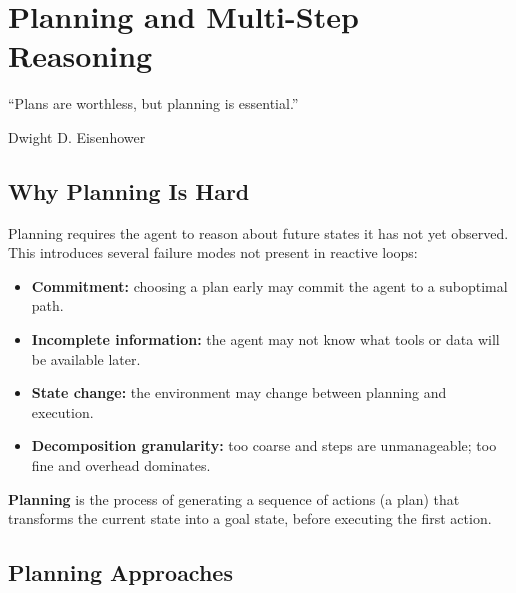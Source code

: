 \chapter{Planning and Multi-Step Reasoning}
\label{ch:planning}

\epigraph{``Plans are worthless, but planning is essential.''}{Dwight D. Eisenhower}


\section{Why Planning Is Hard}

Planning requires the agent to reason about future states it has not yet observed. This introduces several failure modes not present in reactive loops:

\begin{itemize}
	\item \textbf{Commitment:} choosing a plan early may commit the agent to a suboptimal path.
	\item \textbf{Incomplete information:} the agent may not know what tools or data will be available later.
	\item \textbf{State change:} the environment may change between planning and execution.
	\item \textbf{Decomposition granularity:} too coarse and steps are unmanageable; too fine and overhead dominates.
\end{itemize}

\begin{definition}[Planning]
	\textbf{Planning} is the process of generating a sequence of actions (a plan) that transforms the current state into a goal state, before executing the first action.
\end{definition}

\section{Planning Approaches}

